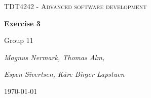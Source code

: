 \documentclass{article}
\begin{document}
\begin{titlepage}
	\centering
	{\scshape\huge TDT4242 - Advanced software development\par}
	\vspace{1.5cm}
	{\huge\bfseries Exercise 3\par}
	\vspace{2cm}
	{\Large Group 11\par}
	{\Large\itshape Magnus Nermark, Thomas Alm,\par}
	{\Large\itshape Espen Sivertsen, Kåre Birger Lapstuen\par}


	\vfill
	


	{\large \today\par}
\end{titlepage}
\tableofcontents
\newpage














\end{document}
